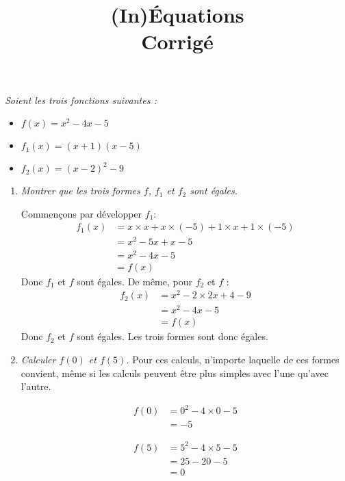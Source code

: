 \documentclass[12pt]{article}
\title{(In)Équations\\Corrigé}
\date{}
\begin{document}
\maketitle
\begin{exercice}
  \emph{Soient les trois fonctions suivantes :}
  \begin{itemize}[$\bullet$]
    \item $f(x)=x^2-4x-5$
    \item $f_1(x)=\left( x+1 \right)\left( x-5 \right)$
    \item $f_2(x)=\left( x-2 \right)^2-9$
  \end{itemize}
  
  \begin{enumerate}
    \item \emph{Montrer que les trois formes $f$, $f_1$ et $f_2$ sont égales.}

      Commençons par développer $f_1$:
      \begin{align*}
        f_1(x) &= x\times x+x\times(-5)+1\times x+1\times(-5)\\
               &= x^2-5x+x-5\\
               &= x^2-4x-5\\
               &=f(x)
      \end{align*}
      Donc $f_1$ et $f$ sont égales. De même, pour $f_2$ et $f$ :
      \begin{align*}
        f_2(x) &= x^2-2\times2x+4-9\\
               &= x^2-4x-5\\
               &= f(x)
      \end{align*}
      Donc $f_2$ et $f$ sont égales. Les trois formes sont donc égales.
    \item \emph{Calculer $f(0)$ et $f(5)$.}
      Pour ces calculs, n'importe laquelle de ces formes convient, même si les calculs peuvent être plus simples avec l'une qu'avec l'autre.

      \begin{align*}
        f(0) &= 0^2-4\times0-5\\
             &= -5
      \end{align*}

      \begin{align*}
        f(5) &= 5^2-4\times5-5\\
             &= 25-20-5\\
             &= 0
      \end{align*}


\end{enumerate}
\end{exercice}
\end{document}
